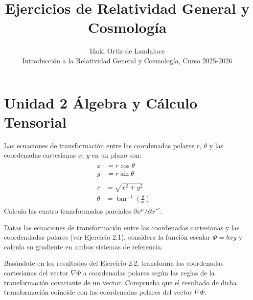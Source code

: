 \documentclass[12pt]{article}
\newenvironment{exercise}[2][Ejercicio]{\begin{trivlist} 
\item[\hskip \labelsep {\bfseries #1}\hskip \labelsep {\bfseries #2.}]}{\end{trivlist}}
\begin{document}
 
 
\title{Ejercicios de Relatividad General y Cosmología}
\author{Iñaki Ortiz de Landaluce\\ 
Introducción a la Relatividad General y Cosmología, Curso 2025-2026}
\date{} 
\maketitle

\section*{Unidad 2 Álgebra y Cálculo Tensorial}

\begin{exercise}{2.1} 
Las ecuaciones de transformación entre las coordenadas polares $r$, $\theta$ y las coordenadas cartesianas $x$, $y$ en un plano son:
\begin{gather}
\begin{aligned}
x &= r\cos\theta\\
y &= r\sin\theta
\end{aligned}
\quad \text{}
\tag{1}
\\[6pt]
\begin{aligned}
r &= \sqrt{x^{2}+y^{2}}\\
\theta &= \tan^{-1}\!\left(\frac{y}{x}\right)
\end{aligned}
\quad \text{}
\tag{2}
\end{gather}
Calcula las cuatro transformadas parciales $\partial{x^{\mu}}/\partial{x'^{\nu}}$. 
\end{exercise}

\begin{exercise}{2.2} 
Datas las ecuaciones de transformación entre las coordenadas cartesianas y las coordendadas polares (ver Ejercicio 2.1), considera la función escalar $\Phi = bxy$ y calcula su gradiente en ambos sistemas de referencia.
\end{exercise}

\begin{exercise}{2.3}
Basándote en los resultados del Ejercicio 2.2, transforma las coordenadas cartesianas del vector $\nabla \Phi$ a coordenadas polares según las reglas de la transformación covariante de un vector. Comprueba que el resultado de dicha transformación coincide con las coordenadas polares del vector $\nabla \Phi$.
\end{exercise}
\end{document}
